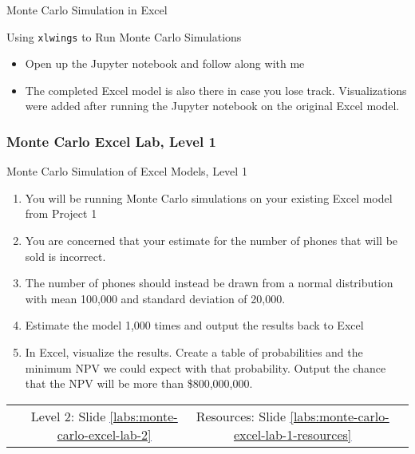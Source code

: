 \documentclass[handout, 11pt]{beamer}
\begin{document}
\begin{section}[Excel MC]{Monte Carlo Simulation in Excel}
\begin{frame}
{\begin{block}{Using \texttt{xlwings} to Run Monte Carlo Simulations}
\begin{itemize}
\item Open up the Jupyter notebook and follow along with me
\item The completed Excel model is also there in case you lose track. Visualizations were added after running the Jupyter notebook on the original Excel model.
\end{itemize}
\end{block}
}
\end{frame}
\begin{frame}
\frametitle{Monte Carlo Excel Lab, Level 1}
{
\begin{block}{Monte Carlo Simulation of Excel Models, Level 1}
\begin{enumerate}
\item You will be running Monte Carlo simulations on your existing Excel model from Project 1
\item You are concerned that your estimate for the number of phones that will be sold is incorrect. 
\item The number of phones should instead be drawn from a normal distribution with mean 100,000 and standard deviation of 20,000.
\item Estimate the model 1,000 times and output the results back to Excel
\item In Excel, visualize the results.  Create a table of probabilities and the minimum NPV we could expect with that probability. Output the chance that the NPV will be more than \$800,000,000.
\end{enumerate}
\vfill
\begin{tabular*}{\textwidth}{@{\extracolsep{\fill}}cccc}
\toprule
\hfill & Level 2: Slide \textcolor{blue}{\underline{\ref{labs:monte-carlo-excel-lab-2}}} & Resources: Slide \textcolor{blue}{\underline{\ref{labs:monte-carlo-excel-lab-1-resources}}} & \hfill\\

\end{tabular*}
\end{block}
}
\label{labs:monte-carlo-excel-lab-1}
\end{frame}
\end{section}
\appendix
{}
\setcounter{finalframe}{\value{framenumber}}
\end{document}
